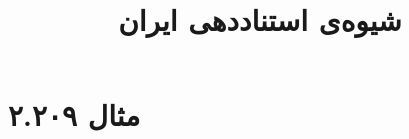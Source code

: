 \documentclass[a4paper,10pt]{article}
\begin{document}
\title{شیوه‌ی استناددهی ایران}
\author{}
\date{}
\maketitle



\section*{مثال ۲.۲۰۹}

\cite{فلاحی1380}\\
\cite{خاکنژاد1367}\\
\begin{latin}
\cite{schwarz2000}
\end{latin}






\end{document}
